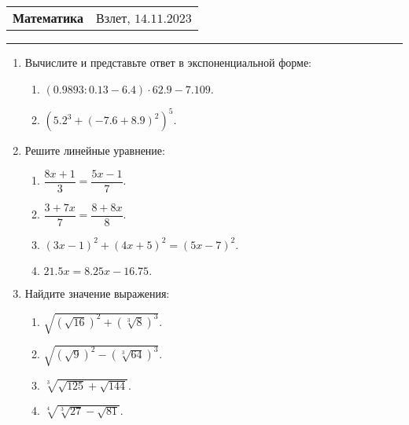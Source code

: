 \documentclass[12pt]{article}
\begin{document}
 \begin{tabularx}{\textwidth}{Xr}
  {\Large \textbf{Математика}} & Взлет, $14.11.2023$ \\
 \end{tabularx}
 \noindent\rule{\textwidth}{0.4pt}
 \begin{enumerate}
    \item Вычислите и представьте ответ в экспоненциальной форме:
    \begin{multicols}{2}
		\begin{enumerate}[label=\textbf{\Alph*.}]
			\item{
                $(0.9893:0.13 - 6.4)\cdot62.9 - 7.109.$
            }
			\item{
                $\left(5.2^3 + (-7.6 + 8.9)^2\right)^5.$
            }
		\end{enumerate}
	\end{multicols}

    \item Решите линейные уравнение:
	\begin{multicols}{2}
		\begin{enumerate}[label=\textbf{\Alph*.}]
			\item{
                $\dfrac{8x+1}{3} = \dfrac{5x-1}{7}.$
            } \item{
                $\dfrac{3+7x}{7} = \dfrac{8 + 8x}{8}.$
            }
			\item{
                $(3x - 1)^2 + (4x + 5)^2 = (5x - 7)^2.$
            } \item{
                $21.5x = 8.25x - 16.75.$
            } 
		\end{enumerate}
	\end{multicols}

    \item Найдите значение выражения:
    \begin{multicols}{2}
		\begin{enumerate}[label=\textbf{\Alph*.}]
			\item{
                $\sqrt{\left(\sqrt{16}\right)^2 + \left(\sqrt[3]{8}\right)^3}.$
            } \item{
                $\sqrt{\left(\sqrt{9}\right)^2 - \left(\sqrt[3]{64}\right)^3}.$
            }
			\item{
                $\sqrt[3]{\sqrt{125} + \sqrt{144}}.$
            } \item{
                $\sqrt[4]{\sqrt[3]{27} - \sqrt{81}}.$
            } 
		\end{enumerate}
	\end{multicols}


\end{enumerate}
\end{document}
